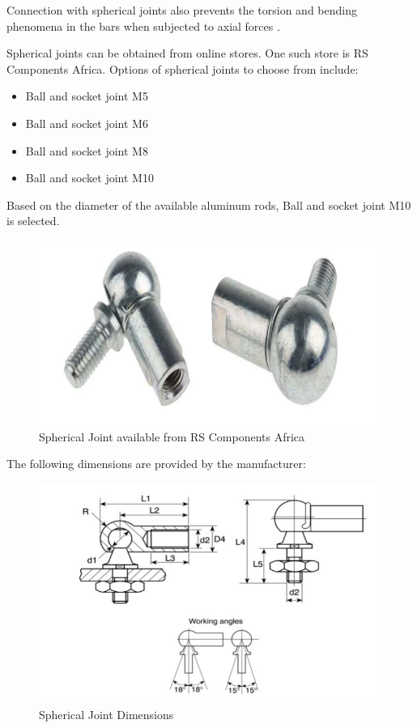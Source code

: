 Connection with spherical joints also prevents the torsion and bending phenomena in the bars when subjected to axial forces \cite{fernandes_design_nodate}.

Spherical joints can be obtained from online stores. One such store is RS Components Africa. Options of spherical joints to choose from include:
\begin{itemize}
\item Ball and socket joint M5
\item Ball and socket joint M6
\item Ball and socket joint M8
\item Ball and socket joint M10
\end{itemize}
Based on the diameter of the available aluminum rods, Ball and socket joint M10 is selected.
\begin{center}
	\begin{figure}[!h]
	\centering
	\includegraphics[width=0.6\linewidth]{Figures/Spherical}
	\caption[Spherical Joint]{Spherical Joint available from RS Components Africa \cite{datasheet_spherical}}
	\end{figure}
\end{center}
The following dimensions are provided by the manufacturer:
\begin{center}
	\begin{figure}[!h]
	\centering
	\includegraphics[width=0.8\linewidth]{Figures/Spherical Dimensions}
	\caption[Spherical Joint Dimensions]{Spherical Joint Dimensions \cite{datasheet_spherical}}
	\end{figure}
\end{center}

